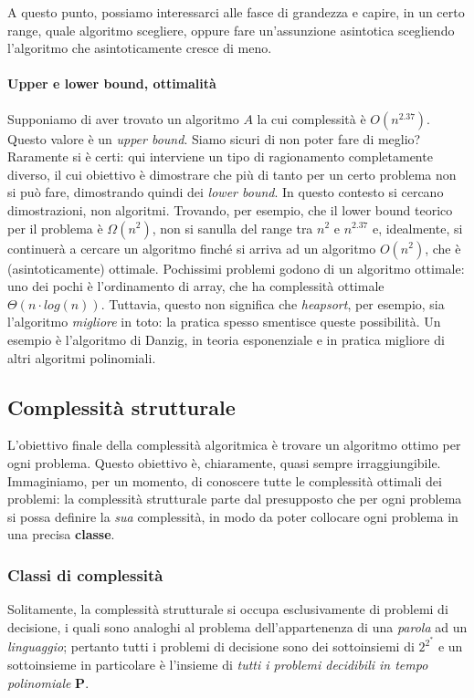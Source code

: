 A questo punto, possiamo interessarci alle fasce di grandezza e capire, in un
certo range, quale algoritmo scegliere, oppure fare un'assunzione asintotica
scegliendo l'algoritmo che asintoticamente cresce di meno.

\paragraph{Upper e lower bound, ottimalità}
Supponiamo di aver trovato un algoritmo $A$ la cui complessità è $O(n^{2.37})$.
Questo valore è un \textit{upper bound}. Siamo sicuri di non poter fare di meglio?
Raramente si è certi: qui interviene un tipo di ragionamento completamente
diverso, il cui obiettivo è dimostrare che più di tanto per un certo problema
non si può fare, dimostrando quindi dei \textit{lower bound}. In questo contesto
si cercano dimostrazioni, non algoritmi. Trovando, per esempio, che il lower
bound teorico per il problema è $\Omega(n^2)$, non si sanulla del range tra
$n^2$ e $n^{2.37}$ e, idealmente, si continuerà a cercare un algoritmo finché si arriva ad un
algoritmo $O(n^2)$, che è (asintoticamente) ottimale. Pochissimi problemi
godono di un algoritmo ottimale: uno dei pochi è l'ordinamento di array, che ha
complessità ottimale $\Theta(n\cdot log(n))$. Tuttavia, questo non significa
che \textit{heapsort}, per esempio, sia l'algoritmo \textit{migliore} in toto:
la pratica spesso smentisce queste possibilità. Un esempio è l'algoritmo
di Danzig, in teoria esponenziale e in pratica migliore di altri algoritmi
polinomiali.

\subsection{Complessità strutturale}
L'obiettivo finale della complessità algoritmica è trovare un algoritmo
ottimo per ogni problema. Questo obiettivo è, chiaramente, quasi sempre
irraggiungibile. Immaginiamo, per un momento, di conoscere tutte le complessità
ottimali dei problemi: la complessità strutturale parte dal presupposto che
per ogni problema si possa definire la \textit{sua} complessità, in modo da
poter collocare ogni problema in una precisa \textbf{classe}.

\subsubsection{Classi di complessità}
Solitamente, la complessità strutturale si occupa esclusivamente di problemi 
di decisione, i quali sono analoghi al problema dell'appartenenza di una 
\textit{parola} ad un \textit{linguaggio}; pertanto tutti i problemi di decisione 
sono dei sottoinsiemi di $2^{2^*}$ e un sottoinsieme in particolare è 
l'insieme di \textit{tutti i problemi decidibili in tempo polinomiale} $\mathbf{P}$. 

